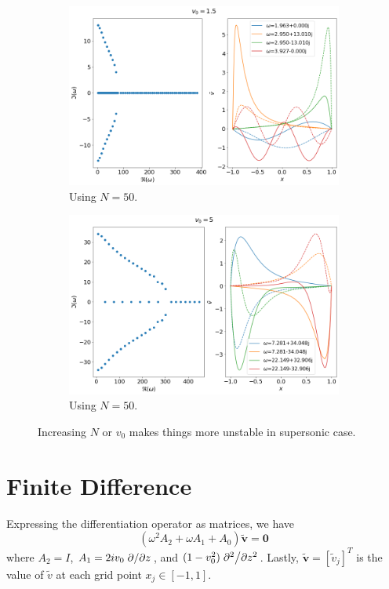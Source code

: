 \documentclass{article}
\begin{document}
\begin{figure}[H]
    \centering
    \begin{subfigure}[b]{0.45\linewidth}
        \includegraphics[width=\linewidth]{img/results-sine-N=100,v0=1.5.png}
        \caption{Using $N=50$.}
    \end{subfigure}%
    \begin{subfigure}[b]{0.45\linewidth}
        \includegraphics[width=\linewidth]{img/results-sine-N=50,v0=5.png}
        \caption{Using $N=50$.}
    \end{subfigure}
    \caption{Increasing $N$ or $v_0$ makes things more unstable in supersonic case.}
    \label{fig:results-sine-unstable}
\end{figure}


\newpage
\section{Finite Difference}
Expressing the differentiation operator as matrices, we have
$$ (\omega^2 A_2 + \omega A_1 + A_0)\mathbf{\tilde{v}} = \mathbf{0} $$
where $A_2 = I$, $A_1 = 2iv_0\pdv*{z}$, and $(1-v_0^2)\pdv*[2]{z}$. Lastly, $\mathbf{\tilde{v}} = [\tilde{v}_j]^T$ is the value of $\tilde{v}$ at each grid point $x_j\in[-1,1]$.
\end{document}

